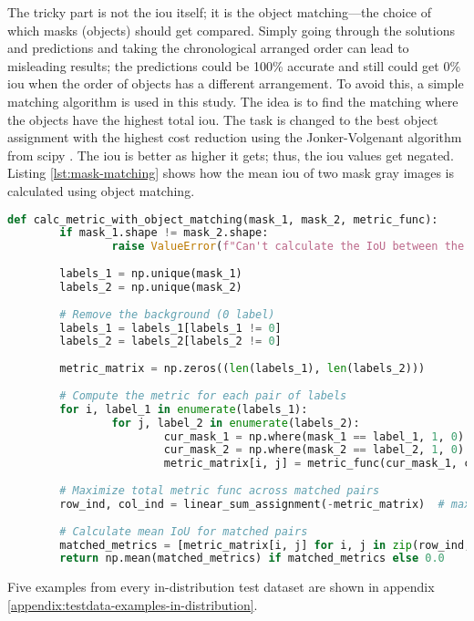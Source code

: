 		The tricky part is not the \ac{iou} itself; it is the object matching—the choice of which masks (objects) should get compared. Simply going through the solutions and predictions and taking the chronological arranged order can lead to misleading results; the predictions could be 100\% accurate and still could get 0\% \ac{iou} when the order of objects has a different arrangement. To avoid this, a simple matching algorithm is used in this study. The idea is to find the matching where the objects have the highest total \ac{iou}. The task is changed to the best object assignment with the highest cost reduction using the Jonker-Volgenant algorithm \cite{Jonker1987} from scipy \cite{scipy}. The \ac{iou} is better as higher it gets; thus, the \ac{iou} values get negated. Listing \ref{lst:mask-matching} shows how the mean \ac{iou} of two mask gray images is calculated using object matching.
		\begin{lstlisting}[language=Python,caption=Calculate the mean \acl{iou} between two mask images using mask matching, label=lst:mask-matching]
def calc_metric_with_object_matching(mask_1, mask_2, metric_func):
		if mask_1.shape != mask_2.shape:
				raise ValueError(f"Can't calculate the IoU between the 2 masks because of different shapes: {mask_1.shape} and {mask_2.shape}")
		
		labels_1 = np.unique(mask_1)
		labels_2 = np.unique(mask_2)
		
		# Remove the background (0 label)
		labels_1 = labels_1[labels_1 != 0]
		labels_2 = labels_2[labels_2 != 0]
		
		metric_matrix = np.zeros((len(labels_1), len(labels_2)))
		
		# Compute the metric for each pair of labels
		for i, label_1 in enumerate(labels_1):
				for j, label_2 in enumerate(labels_2):
						cur_mask_1 = np.where(mask_1 == label_1, 1, 0)
						cur_mask_2 = np.where(mask_2 == label_2, 1, 0)
						metric_matrix[i, j] = metric_func(cur_mask_1, cur_mask_2)
		
		# Maximize total metric func across matched pairs
		row_ind, col_ind = linear_sum_assignment(-metric_matrix)  # maximize IoU
		
		# Calculate mean IoU for matched pairs
		matched_metrics = [metric_matrix[i, j] for i, j in zip(row_ind, col_ind)]
		return np.mean(matched_metrics) if matched_metrics else 0.0
		\end{lstlisting}
		
		Five examples from every in-distribution test dataset are shown in appendix \ref{appendix:testdata-examples-in-distribution}.
	
